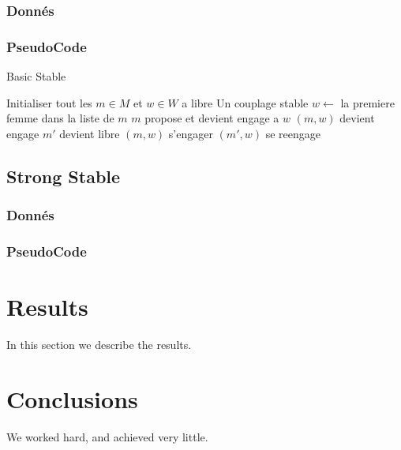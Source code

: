 \documentclass[11pt]{article}
\begin{document}
\subsubsection{Donn\'es}
\subsubsection{PseudoCode}
\begin{algorithm}
\caption{Basic Stable}
\begin{algorithmic} 
\REQUIRE Initialiser tout les $m \in M$ et $w \in W$ a libre
\ENSURE Un couplage stable
\STATE $w \leftarrow$ la premiere femme dans la liste de $m$
\STATE $m$ propose et devient engage a $w$
\STATE $(m, w)$ devient engage
\STATE $m'$ devient libre
\STATE $(m, w)$ s'engager
\ELSE
\STATE $(m', w)$ se reengage
\ENDIF
\ENDIF
\ENDWHILE
\end{algorithmic}
\end{algorithm}

    
\subsection{Strong Stable}
\subsubsection{Donn\'es}
\subsubsection{PseudoCode}

\section{Results}\label{results}
In this section we describe the results.

\section{Conclusions}\label{conclusions}
We worked hard, and achieved very little.



\end{document}
